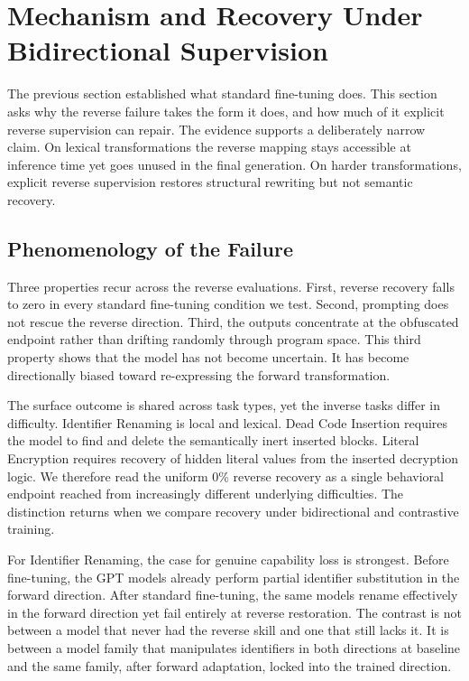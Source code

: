 \section{Mechanism and Recovery Under Bidirectional Supervision}
\label{sec:cs_mechanism_section}

The previous section established what standard fine-tuning does. This section
asks why the reverse failure takes the form it does, and how much of it explicit
reverse supervision can repair. The evidence supports a deliberately narrow
claim. On lexical transformations the reverse mapping stays accessible at
inference time yet goes unused in the final generation. On harder
transformations, explicit reverse supervision restores structural rewriting but
not semantic recovery.

\subsection{Phenomenology of the Failure}
\label{sec:cs_phenomenology}

Three properties recur across the reverse evaluations. First, reverse recovery
falls to zero in every standard fine-tuning condition we test. Second, prompting
does not rescue the reverse direction. Third, the outputs concentrate at the
obfuscated endpoint rather than drifting randomly through program space. This
third property shows that the model has not become uncertain. It has
become directionally biased toward re-expressing the forward transformation.

The surface outcome is shared across task types, yet the inverse tasks differ in
difficulty. Identifier Renaming is local and lexical. Dead Code Insertion
requires the model to find and delete the semantically inert inserted blocks.
Literal Encryption requires recovery of hidden literal values from the inserted
decryption logic. We therefore read the uniform 0\% reverse recovery as a single
behavioral endpoint reached from increasingly different underlying difficulties.
The distinction returns when we compare recovery under bidirectional and
contrastive training.

For Identifier Renaming, the case for genuine capability loss is strongest.
Before fine-tuning, the GPT models already perform partial identifier
substitution in the forward direction. After standard fine-tuning, the same
models rename effectively in the forward direction yet fail entirely at reverse
restoration. The contrast is
not between a model that never had the reverse skill and one that still lacks it.
It is between a model family that manipulates identifiers in both directions at
baseline and the same family, after forward adaptation, locked into the trained
direction.

